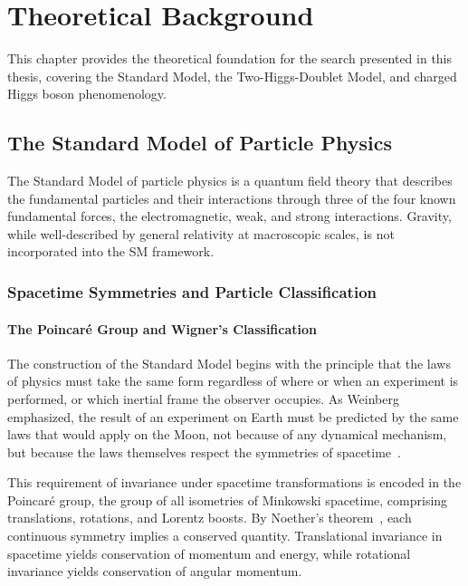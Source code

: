 \chapter{Theoretical Background}
\label{ch:theory}

This chapter provides the theoretical foundation for the search presented in this thesis, covering the Standard Model, the Two-Higgs-Doublet Model, and charged Higgs boson phenomenology.

\section{The Standard Model of Particle Physics}
\label{sec:theory_sm}

The Standard Model of particle physics is a quantum field theory that describes the fundamental particles and their interactions through three of the four known fundamental forces, the electromagnetic, weak, and strong interactions. Gravity, while well-described by general relativity at macroscopic scales, is not incorporated into the SM framework.

\subsection{Spacetime Symmetries and Particle Classification}
\label{sec:spacetime_symmetries}

\subsubsection{The Poincaré Group and Wigner's Classification}

The construction of the Standard Model begins with the principle that the laws of physics must take the same form regardless of where or when an experiment is performed, or which inertial frame the observer occupies. As Weinberg emphasized, the result of an experiment on Earth must be predicted by the same laws that would apply on the Moon, not because of any dynamical mechanism, but because the laws themselves respect the symmetries of spacetime~\cite{Weinberg:1995mt}.

This requirement of invariance under spacetime transformations is encoded in the Poincar\'{e} group, the group of all isometries of Minkowski spacetime, comprising translations, rotations, and Lorentz boosts. By Noether's theorem~\cite{Noether:1918zz}, each continuous symmetry implies a conserved quantity. Translational invariance in spacetime yields conservation of momentum and energy, while rotational invariance yields conservation of angular momentum.

